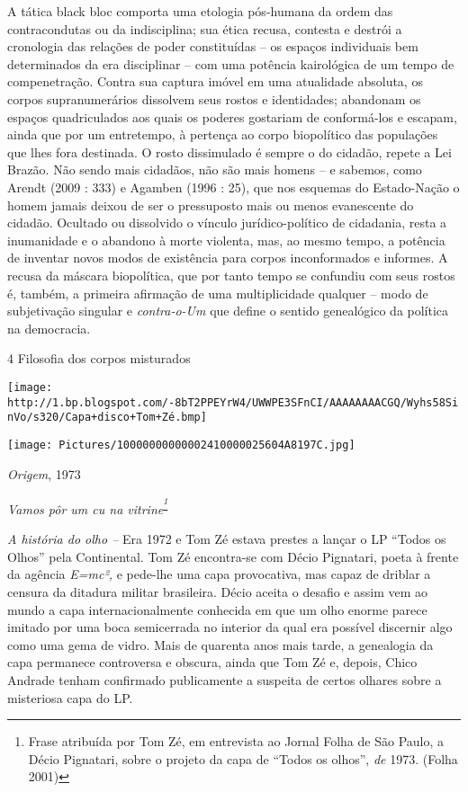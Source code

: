 A tática black bloc comporta uma etologia pós-humana da ordem das
contracondutas ou da indisciplina; sua ética recusa, contesta e destrói
a cronologia das relações de poder constituídas -- os espaços
individuais bem determinados da era disciplinar -- com uma potência
kairológica de um tempo de compenetração. Contra sua captura imóvel em
uma atualidade absoluta, os corpos supranumerários dissolvem seus rostos
e identidades; abandonam os espaços quadriculados aos quais os poderes
gostariam de conformá-los e escapam, ainda que por um entretempo, à
pertença ao corpo biopolítico das populações que lhes fora destinada. O
rosto dissimulado é sempre o do cidadão, repete a Lei Brazão. Não sendo
mais cidadãos, não são mais homens -- e sabemos, como Arendt (2009 :
333) e Agamben (1996 : 25), que nos esquemas do Estado-Nação o homem
jamais deixou de ser o pressuposto mais ou menos evanescente do cidadão.
Ocultado ou dissolvido o vínculo jurídico-político de cidadania, resta a
inumanidade e o abandono à morte violenta, mas, ao mesmo tempo, a
potência de inventar novos modos de existência para corpos inconformados
e informes. A recusa da máscara biopolítica, que por tanto tempo se
confundiu com seus rostos é, também, a primeira afirmação de uma
multiplicidade qualquer -- modo de subjetivação singular e
\emph{contra-o-Um} que define o sentido genealógico da política na
democracia.

4 Filosofia dos corpos misturados

\texttt{[image: http://1.bp.blogspot.com/-8bT2PPEYrW4/UWWPE3SFnCI/AAAAAAAACGQ/Wyhs58SinVo/s320/Capa+disco+Tom+Zé.bmp]}

\texttt{[image: Pictures/10000000000002410000025604A8197C.jpg]}

\emph{Origem}, 1973

\emph{Vamos pôr um cu na vitrine}\textsuperscript{\emph{\footnote{Frase
  atribuída por Tom Zé, em entrevista ao Jornal Folha de São Paulo, a
  Décio Pignatari, sobre o projeto da capa de ``Todos os olhos'',
  \emph{de }1973. (Folha 2001)}}}

\emph{A história do olho -- }Era 1972 e Tom Zé estava prestes a lançar o
LP ``Todos os Olhos'' pela Continental. Tom Zé encontra-se com Décio
Pignatari, poeta à frente da agência \emph{E=mc²,} e pede-lhe uma capa
provocativa, mas capaz de driblar a censura da ditadura militar
brasileira. Décio aceita o desafio e assim vem ao mundo a capa
internacionalmente conhecida em que um olho enorme parece imitado por
uma boca semicerrada no interior da qual era possível discernir algo
como uma gema de vidro. Mais de quarenta anos mais tarde, a genealogia
da capa permanece controversa e obscura, ainda que Tom Zé e, depois,
Chico Andrade tenham confirmado publicamente a suspeita de certos
olhares sobre a misteriosa capa do LP.

